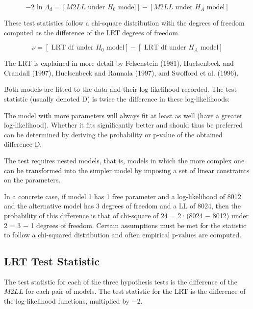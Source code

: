 \documentclass[MAIN.tex]{subfiles}
\begin{document}
\begin{equation}
-2\mbox{ ln }\Lambda_{d} =  [ M2LL \mbox{ under }H_{0} \mbox{ model}] - [ M2LL \mbox{ under }H_{A} \mbox{ model}]
\end{equation}

These test statistics follow a chi-square distribution with the degrees of freedom computed as the difference of the LRT degrees of freedom.

\begin{equation}
\nu = [\mbox{ LRT df under }H_{0} \mbox{ model}] - [\mbox{ LRT df under }H_{A} \mbox{ model}]
\end{equation}

\bigskip

The LRT is explained in more detail by Felsenstein (1981), Huelsenbeck and Crandall (1997), Huelsenbeck and Rannala (1997), and Swofford et al. (1996). 
\bigskip


Both models are fitted to the data and their log-likelihood recorded. The test statistic (usually denoted D) is twice the difference in these log-likelihoods:

The model with more parameters will always fit at least as well (have a greater log-likelihood). Whether it fits significantly better and should thus be preferred can be determined by deriving the probability or p-value of the obtained difference D. 

\bigskip
The test requires nested models, that is, models in which the more complex one can be transformed into the simpler model by imposing a set of linear constraints on the parameters.

In a concrete case, if model 1 has 1 free parameter and a log-likelihood of 8012 and the alternative model has 3 degrees of freedom and a LL of 8024, then the probability of this difference is that of chi-square of 24 = 2·(8024 − 8012) under 2 = 3 − 1 degrees of freedom. Certain assumptions must be met for the statistic to follow a chi-squared distribution and often empirical p-values are computed.


\subsection{LRT Test Statistic}
The test statistic for each of the three hypothesis tests is the difference of the $M2LL$ for each pair of models. The test statistic for the LRT is the difference of the log-likelihood functions, multiplied by $-2$.
\end{document}
